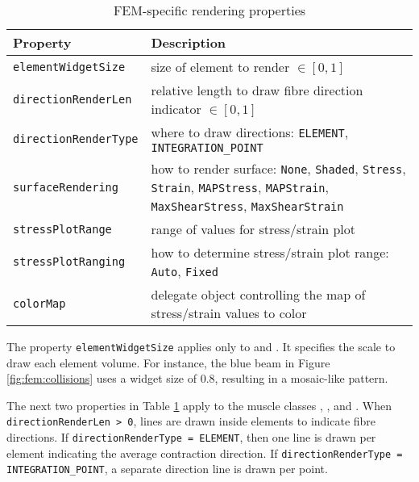 \begin{table}[ht]
	\centering
	\caption{FEM-specific rendering properties} \label{tbl:fem:rendering}
	\begin{tabular}{lp{}}
		\hline\hline
		Property & Description\\
		\hline
	   {\tt elementWidgetSize} & size of element to render $\in [0,1]$\\
	   {\tt directionRenderLen} & relative length to draw fibre direction indicator $\in [0, 1]$\\
	   {\tt directionRenderType} & where to draw directions: {\tt ELEMENT}, {\tt INTEGRATION\_POINT}\\
	   {\tt surfaceRendering} & how to render surface: 
{\tt None}, {\tt Shaded}, {\tt Stress}, {\tt Strain}, {\tt MAPStress}, 
{\tt MAPStrain}, {\tt MaxShearStress}, {\tt MaxShearStrain}\\
	   {\tt stressPlotRange} & range of values for stress/strain plot\\
	   {\tt stressPlotRanging} & how to determine stress/strain plot range: {\tt Auto}, {\tt Fixed}\\
	   {\tt colorMap} & delegate object controlling the map of stress/strain values to color\\
	   \hline
	\end{tabular}
\end{table}

The property {\tt elementWidgetSize} applies only to 
 and
.  It specifies the scale to
draw each element volume.  For instance, the blue beam in Figure \ref{fig:fem:collisions}
uses a widget size of 0.8, resulting in a mosaic-like pattern.

The next two properties in Table \ref{tbl:fem:rendering} apply to the
muscle classes
, 
, and
\pdfbreak
{}.
When {\tt directionRenderLen > 0}, lines are drawn inside elements to indicate fibre
directions.  If {\tt directionRenderType = ELEMENT}, then one line is drawn per
element indicating the average contraction direction.  If 
{\tt directionRenderType = INTEGRATION\_POINT}, a separate direction line is drawn 
per point.

